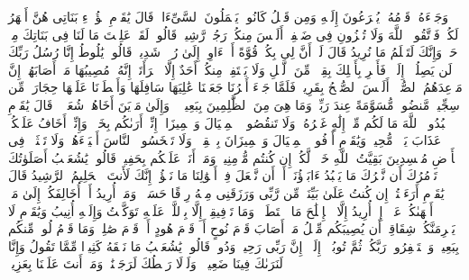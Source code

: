 \startbuffer[\q:11:78]
وَجَاۤءَهُۥ قَوۡمُهُۥ یُهۡرَعُونَ إِلَیۡهِ وَمِن قَبۡلُ كَانُوا۟ یَعۡمَلُونَ ٱلسَّیِّءَاتِۚ قَالَ یَٰقَوۡمِ هَٰۤؤُلَاۤءِ بَنَاتِی هُنَّ أَطۡهَرُ لَكُمۡۖ فَٱتَّقُوا۟ ٱللَّهَ وَلَا تُخۡزُونِ فِی ضَیۡفِیۤۖ أَلَیۡسَ مِنكُمۡ رَجُلࣱ رَّشِیدࣱ%
\stopbuffer%
\startbuffer[\q:11:79]
قَالُوا۟ لَقَدۡ عَلِمۡتَ مَا لَنَا فِی بَنَاتِكَ مِنۡ حَقࣲّ وَإِنَّكَ لَتَعۡلَمُ مَا نُرِیدُ%
\stopbuffer%
\startbuffer[\q:11:80]
قَالَ لَوۡ أَنَّ لِی بِكُمۡ قُوَّةً أَوۡ ءَاوِیۤ إِلَىٰ رُكۡنࣲ شَدِیدࣲ%
\stopbuffer%
\startbuffer[\q:11:81]
قَالُوا۟ یَٰلُوطُ إِنَّا رُسُلُ رَبِّكَ لَن یَصِلُوۤا۟ إِلَیۡكَۖ فَأَسۡرِ بِأَهۡلِكَ بِقِطۡعࣲ مِّنَ ٱلَّیۡلِ وَلَا یَلۡتَفِتۡ مِنكُمۡ أَحَدٌ إِلَّا ٱمۡرَأَتَكَۖ إِنَّهُۥ مُصِیبُهَا مَاۤ أَصَابَهُمۡۚ إِنَّ مَوۡعِدَهُمُ ٱلصُّبۡحُۚ أَلَیۡسَ ٱلصُّبۡحُ بِقَرِیبࣲ%
\stopbuffer%
\startbuffer[\q:11:82]
فَلَمَّا جَاۤءَ أَمۡرُنَا جَعَلۡنَا عَٰلِیَهَا سَافِلَهَا وَأَمۡطَرۡنَا عَلَیۡهَا حِجَارَةࣰ مِّن سِجِّیلࣲ مَّنضُودࣲ%
\stopbuffer%
\startbuffer[\q:11:83]
مُّسَوَّمَةً عِندَ رَبِّكَۖ وَمَا هِیَ مِنَ ٱلظَّٰلِمِینَ بِبَعِیدࣲ%
\stopbuffer%
\startbuffer[\q:11:84]
۞ وَإِلَىٰ مَدۡیَنَ أَخَاهُمۡ شُعَیۡبࣰاۚ قَالَ یَٰقَوۡمِ ٱعۡبُدُوا۟ ٱللَّهَ مَا لَكُم مِّنۡ إِلَٰهٍ غَیۡرُهُۥۖ وَلَا تَنقُصُوا۟ ٱلۡمِكۡیَالَ وَٱلۡمِیزَانَۖ إِنِّیۤ أَرَىٰكُم بِخَیۡرࣲ وَإِنِّیۤ أَخَافُ عَلَیۡكُمۡ عَذَابَ یَوۡمࣲ مُّحِیطࣲ%
\stopbuffer%
\startbuffer[\q:11:85]
وَیَٰقَوۡمِ أَوۡفُوا۟ ٱلۡمِكۡیَالَ وَٱلۡمِیزَانَ بِٱلۡقِسۡطِۖ وَلَا تَبۡخَسُوا۟ ٱلنَّاسَ أَشۡیَاۤءَهُمۡ وَلَا تَعۡثَوۡا۟ فِی ٱلۡأَرۡضِ مُفۡسِدِینَ%
\stopbuffer%
\startbuffer[\q:11:86]
بَقِیَّتُ ٱللَّهِ خَیۡرࣱ لَّكُمۡ إِن كُنتُم مُّؤۡمِنِینَۚ وَمَاۤ أَنَا۠ عَلَیۡكُم بِحَفِیظࣲ%
\stopbuffer%
\startbuffer[\q:11:87]
قَالُوا۟ یَٰشُعَیۡبُ أَصَلَوٰتُكَ تَأۡمُرُكَ أَن نَّتۡرُكَ مَا یَعۡبُدُ ءَابَاۤؤُنَاۤ أَوۡ أَن نَّفۡعَلَ فِیۤ أَمۡوَٰلِنَا مَا نَشَٰۤؤُا۟ۖ إِنَّكَ لَأَنتَ ٱلۡحَلِیمُ ٱلرَّشِیدُ%
\stopbuffer%
\startbuffer[\q:11:88]
قَالَ یَٰقَوۡمِ أَرَءَیۡتُمۡ إِن كُنتُ عَلَىٰ بَیِّنَةࣲ مِّن رَّبِّی وَرَزَقَنِی مِنۡهُ رِزۡقًا حَسَنࣰاۚ وَمَاۤ أُرِیدُ أَنۡ أُخَالِفَكُمۡ إِلَىٰ مَاۤ أَنۡهَىٰكُمۡ عَنۡهُۚ إِنۡ أُرِیدُ إِلَّا ٱلۡإِصۡلَٰحَ مَا ٱسۡتَطَعۡتُۚ وَمَا تَوۡفِیقِیۤ إِلَّا بِٱللَّهِۚ عَلَیۡهِ تَوَكَّلۡتُ وَإِلَیۡهِ أُنِیبُ%
\stopbuffer%
\startbuffer[\q:11:89]
وَیَٰقَوۡمِ لَا یَجۡرِمَنَّكُمۡ شِقَاقِیۤ أَن یُصِیبَكُم مِّثۡلُ مَاۤ أَصَابَ قَوۡمَ نُوحٍ أَوۡ قَوۡمَ هُودٍ أَوۡ قَوۡمَ صَٰلِحࣲۚ وَمَا قَوۡمُ لُوطࣲ مِّنكُم بِبَعِیدࣲ%
\stopbuffer%
\startbuffer[\q:11:90]
وَٱسۡتَغۡفِرُوا۟ رَبَّكُمۡ ثُمَّ تُوبُوۤا۟ إِلَیۡهِۚ إِنَّ رَبِّی رَحِیمࣱ وَدُودࣱ%
\stopbuffer%
\startbuffer[\q:11:91]
قَالُوا۟ یَٰشُعَیۡبُ مَا نَفۡقَهُ كَثِیرࣰا مِّمَّا تَقُولُ وَإِنَّا لَنَرَىٰكَ فِینَا ضَعِیفࣰاۖ وَلَوۡلَا رَهۡطُكَ لَرَجَمۡنَٰكَۖ وَمَاۤ أَنتَ عَلَیۡنَا بِعَزِیزࣲ%
